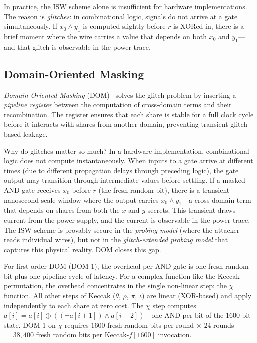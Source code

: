 In practice, the ISW scheme alone is insufficient for hardware implementations.  The reason is \emph{glitches}: in combinational logic, signals do not arrive at a gate simultaneously.  If $x_0 \wedge y_1$ is computed slightly before $r$ is XORed in, there is a brief moment where the wire carries a value that depends on both $x_0$ and $y_1$---and that glitch is observable in the power trace.


\subsection{Domain-Oriented Masking}
\label{subsec:dom}

\emph{Domain-Oriented Masking} (DOM)~\cite{GrossHankeDeMulder2016} solves the glitch problem by inserting a \emph{pipeline register} between the computation of cross-domain terms and their recombination.  The register ensures that each share is stable for a full clock cycle before it interacts with shares from another domain, preventing transient glitch-based leakage.

Why do glitches matter so much?  In a hardware implementation, combinational logic does not compute instantaneously.  When inputs to a gate arrive at different times (due to different propagation delays through preceding logic), the gate output may transition through intermediate values before settling.  If a masked AND gate receives $x_0$ before $r$ (the fresh random bit), there is a transient nanosecond-scale window where the output carries $x_0 \wedge y_1$---a cross-domain term that depends on shares from both the $x$ and $y$ secrets.  This transient draws current from the power supply, and the current is observable in the power trace.  The ISW scheme is provably secure in the \emph{probing model} (where the attacker reads individual wires), but not in the \emph{glitch-extended probing model} that captures this physical reality.  DOM closes this gap.

For first-order DOM (DOM-1), the overhead per AND gate is one fresh random bit plus one pipeline cycle of latency.  For a complex function like the Keccak permutation, the overhead concentrates in the single non-linear step: the $\chi$ function.  All other steps of Keccak ($\theta$, $\rho$, $\pi$, $\iota$) are linear (XOR-based) and apply independently to each share at zero cost.  The $\chi$ step computes $a[i] = a[i] \oplus ((\neg a[i{+}1]) \wedge a[i{+}2])$---one AND per bit of the 1600-bit state.  DOM-1 on $\chi$ requires $1600$ fresh random bits per round $\times$ $24$ rounds $= 38{,}400$ fresh random bits per Keccak-$f[1600]$ invocation.

